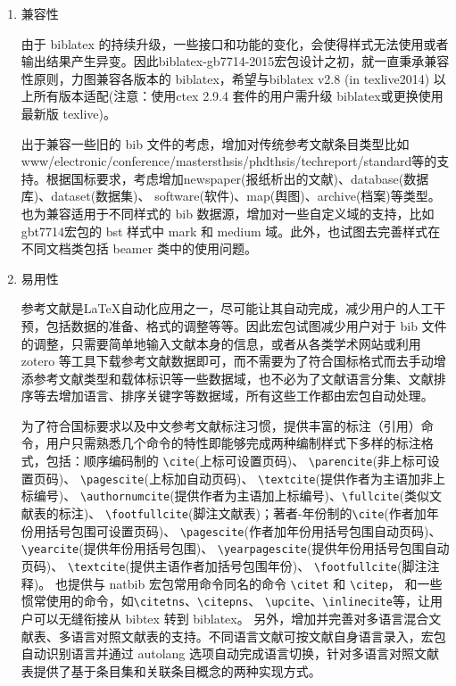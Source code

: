 \documentclass[11pt]{article} %
\begin{document}
\begin{enumerate}
  \item 兼容性

由于 biblatex 的持续升级，一些接口和功能的变化，会使得样式无法使用或者输出结果产生异变。因此biblatex-gb7714-2015宏包设计之初，就一直秉承兼容性原则，力图兼容各版本的 biblatex，希望与biblatex v2.8 (in texlive2014) 以上所有版本适配(注意：使用ctex 2.9.4 套件的用户需升级 biblatex或更换使用最新版 texlive)。

出于兼容一些旧的 bib 文件的考虑，增加对传统参考文献条目类型比如www/electronic/conference/mastersthsis/phdthsis/techreport/standard等的支持。根据国标要求，考虑增加newspaper(报纸析出的文献)、database(数据库)、dataset(数据集)、 software(软件)、map(舆图)、archive(档案)等类型。也为兼容适用于不同样式的 bib 数据源，增加对一些自定义域的支持，比如gbt7714宏包的 bst 样式中 mark 和 medium 域。此外，也试图去完善样式在不同文档类包括 beamer 类中的使用问题。

  \item 易用性

参考文献是\LaTeX{}自动化应用之一，尽可能让其自动完成，减少用户的人工干预，包括数据的准备、格式的调整等等。因此宏包试图减少用户对于 bib 文件的调整，只需要简单地输入文献本身的信息，或者从各类学术网站或利用 zotero 等工具下载参考文献数据即可，而不需要为了符合国标格式而去手动增添参考文献类型和载体标识等一些数据域，也不必为了文献语言分集、文献排序等去增加语言、排序关键字等数据域，所有这些工作都由宏包自动处理。

为了符合国标要求以及中文参考文献标注习惯，提供丰富的标注（引用）命令，用户只需熟悉几个命令的特性即能够完成两种编制样式下多样的标注格式，包括：顺序编码制的 \verb|\cite|(上标可设置页码)、 \verb|\parencite|(非上标可设置页码)、 \verb|\pagescite|(上标加自动页码)、 \verb|\textcite|(提供作者为主语加非上标编号)、 \verb|\authornumcite|(提供作者为主语加上标编号)、\verb|\fullcite|(类似文献表的标注)、 \verb|\footfullcite|(脚注文献表)；著者-年份制的\verb|\cite|(作者加年份用括号包围可设置页码)、 \verb|\pagescite|(作者加年份用括号包围自动页码)、
\verb|\yearcite|(提供年份用括号包围)、 \verb|\yearpagescite|(提供年份用括号包围自动页码)、
\verb|\textcite|(提供主语作者加括号包围年份)、 \verb|\footfullcite|(脚注注释)。
也提供与 natbib 宏包常用命令同名的命令 \verb|\citet| 和 \verb|\citep|，
和一些惯常使用的命令，如\verb|\citetns|、\verb|\citepns|、
\verb|\upcite|、\verb|\inlinecite|等，让用户可以无缝衔接从 bibtex 转到 biblatex。
另外，增加并完善对多语言混合文献表、多语言对照文献表的支持。不同语言文献可按文献自身语言录入，宏包自动识别语言并通过 autolang 选项自动完成语言切换，针对多语言对照文献表提供了基于条目集和关联条目概念的两种实现方式。



\end{enumerate}
\end{document}
